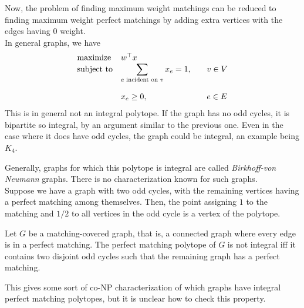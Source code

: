 	Now, the problem of finding maximum weight matchings can be reduced to finding maximum weight perfect matchings by adding extra vertices with the edges having $0$ weight.\\

	In general graphs, we have
	\[
	\label{max-wt-pm-lp-2}
	\begin{array}{ll@{}ll}
	\text{maximize}  & w^\top x &\\
	\text{subject to}& \displaystyle\sum\limits_{e \text{ incident on } v} x_{e} = 1,  &\qquad v \in V\\\\
	                 & x_{e} \ge 0,                                                &\qquad e \in E
	\end{array}
	\]
	This is in general not an integral polytope.
	If the graph has no odd cycles, it is bipartite so integral, by an argument similar to the previous one. Even in the case where it does have odd cycles, the graph could be integral, an example being $K_4$.

	Generally, graphs for which this polytope is integral are called \emph{Birkhoff-von Neumann} graphs. There is no characterization known for such graphs.\\
	Suppose we have a graph with two odd cycles, with the remaining vertices having a perfect matching among themselves. Then, the point assigning $1$ to the matching and $1/2$ to all vertices in the odd cycle is a vertex of the polytope.
	\begin{ftheo}
		Let $G$ be a matching-covered graph, that is, a connected graph where every edge is in a perfect matching. The perfect matching polytope of $G$ is not integral iff it contains two disjoint odd cycles such that the remaining graph has a perfect matching.
	\end{ftheo}

	This gives some sort of co-\textsf{NP} characterization of which graphs have integral perfect matching polytopes, but it is unclear how to check this property.
